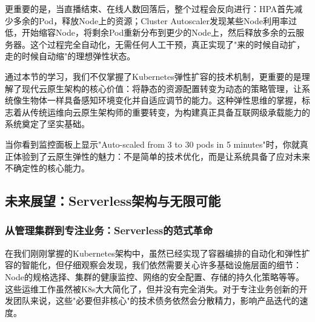 更重要的是，当直播结束、在线人数回落后，整个过程会反向进行：HPA首先减少多余的Pod，释放Node上的资源；Cluster Autoscaler发现某些Node利用率过低，开始缩容Node，将剩余Pod重新分布到更少的Node上，然后释放多余的云服务器。这个过程完全自动化，无需任何人工干预，真正实现了"来的时候自动扩，走的时候自动缩"的理想弹性状态。

通过本节的学习，我们不仅掌握了Kubernetes弹性扩容的技术机制，更重要的是理解了现代云原生架构的核心价值：将静态的资源配置转变为动态的策略管理，让系统像生物体一样具备感知环境变化并自适应调节的能力。这种弹性思维的掌握，标志着从传统运维向云原生架构师的重要转变，为构建真正具备互联网级承载能力的系统奠定了坚实基础。

当你看到监控面板上显示"Auto-scaled from 3 to 30 pods in 5 minutes"时，你就真正体验到了云原生弹性的魅力：不是简单的技术优化，而是让系统具备了应对未来不确定性的核心能力。




\subsection{未来展望：Serverless架构与无限可能}

\subsubsection{从管理集群到专注业务：Serverless的范式革命}

在我们刚刚掌握的Kubernetes架构中，虽然已经实现了容器编排的自动化和弹性扩容的智能化，但仔细观察会发现，我们依然需要关心许多基础设施层面的细节：Node的规格选择、集群的健康监控、网络的安全配置、存储的持久化策略等等。这些运维工作虽然被K8s大大简化了，但并没有完全消失。对于专注业务创新的开发团队来说，这些"必要但非核心"的技术债务依然会分散精力，影响产品迭代的速度。

